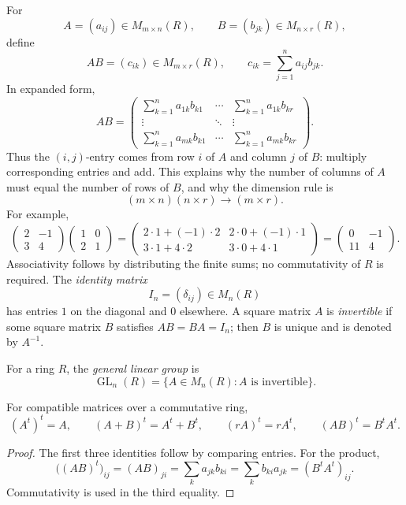For
\[
A=(a_{ij})\in M_{m\times n}(R),
\qquad
B=(b_{jk})\in M_{n\times r}(R),
\]
define
\[
AB=(c_{ik})\in M_{m\times r}(R),
\qquad
c_{ik}=\sum_{j=1}^n a_{ij}b_{jk}.
\]
In expanded form,
\[
AB=
\begin{pmatrix}
\displaystyle\sum_{k=1}^n a_{1k}b_{k1}&\cdots&\displaystyle\sum_{k=1}^n a_{1k}b_{kr}\\
\vdots&\ddots&\vdots\\
\displaystyle\sum_{k=1}^n a_{mk}b_{k1}&\cdots&\displaystyle\sum_{k=1}^n a_{mk}b_{kr}
\end{pmatrix}.
\]
Thus the \((i,j)\)-entry comes from row \(i\) of \(A\) and column \(j\) of
\(B\): multiply corresponding entries and add. This explains why the number
of columns of \(A\) must equal the number of rows of \(B\), and why the
dimension rule is
\[
(m\times n)(n\times r)\longrightarrow(m\times r).
\]
For example,
\[
\begin{pmatrix}2&-1\\3&4\end{pmatrix}
\begin{pmatrix}1&0\\2&1\end{pmatrix}
=\begin{pmatrix}
2\cdot1+(-1)\cdot2&2\cdot0+(-1)\cdot1\\
3\cdot1+4\cdot2&3\cdot0+4\cdot1
\end{pmatrix}
=\begin{pmatrix}0&-1\\11&4\end{pmatrix}.
\]
Associativity follows by distributing the finite sums; no commutativity of
\(R\) is required. The \emph{identity matrix}
\[
I_n=(\delta_{ij})\in M_n(R)
\]
has entries \(1\) on the diagonal and \(0\) elsewhere. A square matrix \(A\)
is \emph{invertible} if some square matrix \(B\) satisfies \(AB=BA=I_n\);
then \(B\) is unique and is denoted by \(A^{-1}\).

\begin{definition}
For a ring \(R\), the \emph{general linear group} is
\[
\operatorname{GL}_n(R)
=\{A\in M_n(R):A\text{ is invertible}\}.
\]
\end{definition}

\begin{proposition}
For compatible matrices over a commutative ring,
\[
(A^t)^t=A,
\qquad
(A+B)^t=A^t+B^t,
\qquad
(rA)^t=rA^t,
\qquad
(AB)^t=B^tA^t.
\]
\end{proposition}
\begin{proof}
The first three identities follow by comparing entries. For the product,
\[
\bigl((AB)^t\bigr)_{ij}
=(AB)_{ji}
=\sum_k a_{jk}b_{ki}
=\sum_k b_{ki}a_{jk}
=(B^tA^t)_{ij}.
\]
Commutativity is used in the third equality.
\end{proof}


